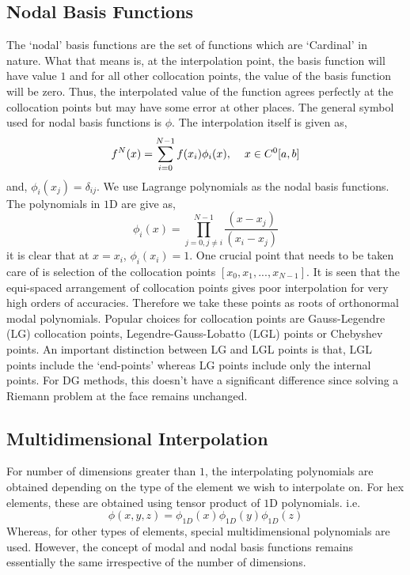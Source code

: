 \subsection{Nodal Basis Functions}
The `nodal' basis functions are the set of functions which are `Cardinal' in nature. What that means is, at the
interpolation point, the basis function will have value $1$ and for all other collocation points, the value of the 
basis function will be zero. Thus, the interpolated value of the function agrees perfectly at the collocation points
but may have some error at other places. 
The general symbol used for nodal basis functions is $\phi$.
The interpolation itself is given as,
\begin{equation}
	f^N(x) = \sum_{i=0}^{N-1} f(x_i) \phi_i(x), \hspace{4mm} x \in C^0[a,b]
\end{equation}
and, $\phi_i(x_j) = \delta_{ij}$.
We use Lagrange polynomials as the nodal basis functions. The polynomials in $1$D are give as,
\begin{equation}
	\phi_i(x) = \prod_{j=0 , j \ne i}^{N-1} \frac{(x-x_j)}{(x_i - x_j)}
\end{equation}
it is clear that at $x=x_i$, $\phi_i(x_i) = 1$.
One crucial point that needs to be taken care of is selection of the collocation points $\left[x_0, x_1, ..., x_{N-1}\right]$.
It is seen that the equi-spaced arrangement of collocation points gives poor interpolation for very high orders of 
accuracies. Therefore we take these points as roots of orthonormal modal polynomials.
Popular choices for collocation points are Gauss-Legendre (LG) collocation points, Legendre-Gauss-Lobatto (LGL) points
or Chebyshev points. An important distinction between LG and LGL points is that, LGL points include the `end-points' 
whereas LG points include only the internal points. For DG methods, this doesn't have a significant difference since 
solving a Riemann problem at the face remains unchanged.

\subsection{Multidimensional Interpolation}
For number of dimensions greater than $1$, the interpolating polynomials are obtained depending on the type of the
element we wish to interpolate on. For hex elements, these are obtained using tensor product of $1$D polynomials.
i.e. 
\begin{equation}
	\phi(x,y,z) = \phi_{1D}(x)  \phi_{1D}(y)  \phi_{1D}(z)
\end{equation}
Whereas, for other types of elements, special multidimensional polynomials are used. However, the concept of 
modal and nodal basis functions remains essentially the same irrespective of the number of dimensions.
